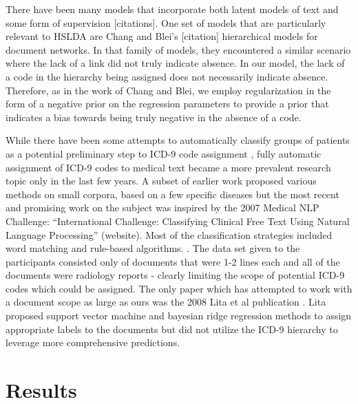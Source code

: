 \documentclass{article}
\begin{document}
There have been many models that incorporate both latent models of
text and some form of supervision {[}citations{]}. One set of models
that are particularly relevant to HSLDA are Chang and Blei's {[}citation{]}
hierarchical models for document networks. In that family of models,
they encountered a similar scenario where the lack of a link did not
truly indicate absence. In our model, the lack of a code in the hierarchy
being assigned does not necessarily indicate absence. Therefore, as
in the work of Chang and Blei, we employ regularization in the form
of a negative prior on the regression parameters to provide a prior
that indicates a bias towards being truly negative in the absence
of a code.

While there have been some attempts to automatically classify groups
of patients as a potential preliminary step to ICD-9 code assignment
\citep{Ruch2008,FreitasJunior2006,RibeiroNeto2001,Brown2006}, fully
automatic assignment of ICD-9 codes to medical text became a more
prevalent research topic only in the last few years. A subset of earlier
work proposed various methods on small corpora, based on a few specific
diseases \citep{Rao2003} but the most recent and promising work on
the subject was inspired by the 2007 Medical NLP Challenge: {}``International
Challenge: Classifying Clinical Free Text Using Natural Language Processing\textquotedblright{}
(website). Most of the classification strategies included word matching
and rule-based algorithms. \citep{Goldstein2007,Crammer2007,Farkas2008}.
The data set given to the participants consisted only of documents
that were 1-2 lines each and all of the documents were radiology reports
- clearly limiting the scope of potential ICD-9 codes which could
be assigned. The only paper which has attempted to work with a document
scope as large as ours was the 2008 Lita et al publication \citep{Lita2008}.
Lita proposed support vector machine and bayesian ridge regression
methods to assign appropriate labels to the documents but did not
utilize the ICD-9 hierarchy to leverage more comprehensive predictions.

\section{Results}
\label{sec:results}
\end{document}
